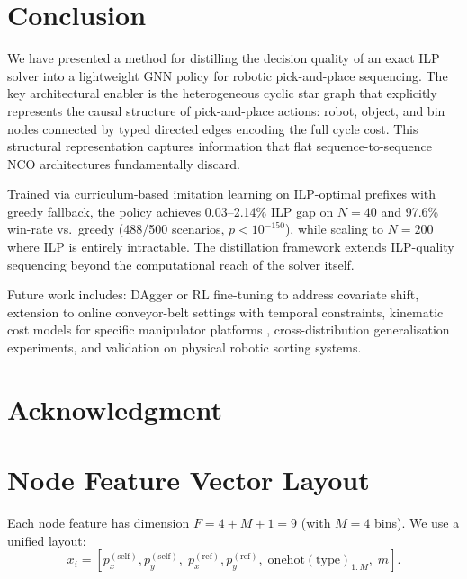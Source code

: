 \documentclass[conference]{IEEEtran}
\begin{document}
\section{Conclusion}\label{sec:conclusion}

We have presented a method for distilling the decision quality of an exact ILP solver into a lightweight GNN policy for robotic pick-and-place sequencing. The key architectural enabler is the heterogeneous cyclic star graph that explicitly represents the causal structure of pick-and-place actions: robot, object, and bin nodes connected by typed directed edges encoding the full cycle cost. This structural representation captures information that flat sequence-to-sequence NCO architectures fundamentally discard.

Trained via curriculum-based imitation learning on ILP-optimal prefixes with greedy fallback, the policy achieves 0.03--2.14\% ILP gap on $N{=}40$ and 97.6\% win-rate vs.\ greedy (488/500 scenarios, $p < 10^{-150}$), while scaling to $N{=}200$ where ILP is entirely intractable. The distillation framework extends ILP-quality sequencing beyond the computational reach of the solver itself.

Future work includes: DAgger or RL fine-tuning to address covariate shift, extension to online conveyor-belt settings with temporal constraints, kinematic cost models for specific manipulator platforms \cite{han2019pap}, cross-distribution generalisation experiments, and validation on physical robotic sorting systems.

\section*{Acknowledgment}

\appendices
\section{Node Feature Vector Layout}\label{app:features}

Each node feature has dimension $F = 4 + M + 1 = 9$ (with $M{=}4$ bins). We use a unified layout:
\begin{equation}
x_i = [p^{(\text{self})}_x, p^{(\text{self})}_y,\; p^{(\text{ref})}_x, p^{(\text{ref})}_y,\; \text{onehot}(\text{type})_{1:M},\; m].
\end{equation}
\end{document}
